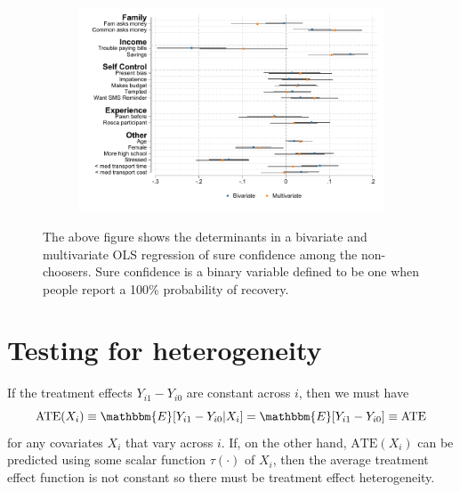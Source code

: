\begin{figure}[H]
    \caption{Determinants sure confidence}
    \label{determinants_sure}
    \begin{center}
    \begin{subfigure}{0.75\textwidth}
        \centering
        \includegraphics[width=\textwidth]{Figuras/determinants_confidence_100.pdf}
    \end{subfigure}
    \end{center}
      \scriptsize

      The above figure shows the determinants in a bivariate and multivariate OLS regression of sure confidence among the non-choosers. Sure confidence is a binary variable defined to be one when people report a 100\% probability of recovery.
\end{figure}




\cleardoublepage







\section{Testing for heterogeneity}
\label{append:chernozhukov}
If the treatment effects $Y_{i1} - Y_{i0}$ are constant across $i$, then we must have
\[
\text{ATE}(X_i) \equiv \mathbbm{E}[Y_{i1} - Y_{i0} |X_i] = \mathbbm{E}[Y_{i1} - Y_{i0}] \equiv \text{ATE}
\]
for any covariates $X_i$ that vary across $i$. If, on the other hand, $\text{ATE}(X_i)$ can be predicted using some scalar function $\tau(\cdot)$ of $X_i$, then the average treatment effect function is not constant so there must be treatment effect heterogeneity. 

